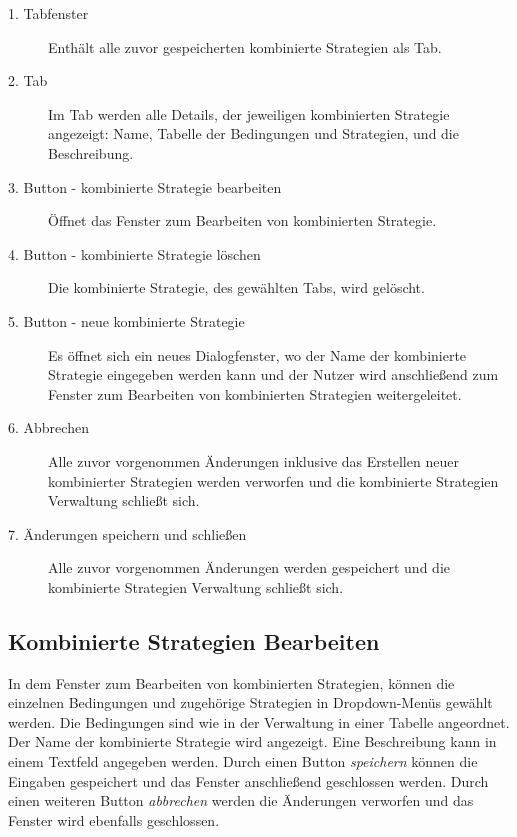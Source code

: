 \begin{description}

\item[1. Tabfenster] Enthält alle zuvor gespeicherten kombinierte Strategien als Tab.

\item[2. Tab] Im Tab werden alle Details, der jeweiligen kombinierten Strategie angezeigt: Name, Tabelle der Bedingungen und Strategien, und die Beschreibung.

\item[3. Button - kombinierte Strategie bearbeiten] Öffnet das Fenster zum Bearbeiten von kombinierten Strategie.

\item[4. Button - kombinierte Strategie löschen] Die kombinierte Strategie, des gewählten Tabs, wird gelöscht.

\item[5. Button - neue kombinierte Strategie] Es öffnet sich ein neues Dialogfenster, wo der Name der kombinierte Strategie eingegeben werden kann und der Nutzer wird anschließend zum Fenster zum Bearbeiten von kombinierten Strategien weitergeleitet.

\item[6. Abbrechen] Alle zuvor vorgenommen Änderungen inklusive das Erstellen neuer kombinierter Strategien werden verworfen und die kombinierte Strategien Verwaltung schließt sich.

\item[7. Änderungen speichern und schließen] Alle zuvor vorgenommen Änderungen werden gespeichert und die kombinierte Strategien Verwaltung schließt sich.

\end{description}


\subsection{Kombinierte Strategien Bearbeiten}

In dem Fenster zum Bearbeiten von kombinierten Strategien, können die einzelnen Bedingungen und zugehörige Strategien in Dropdown-Menüs gewählt werden. Die Bedingungen sind wie in der Verwaltung in einer Tabelle angeordnet. Der Name der kombinierte Strategie wird angezeigt. Eine Beschreibung kann in einem Textfeld angegeben werden.
Durch einen Button \textit{speichern} können die Eingaben gespeichert und das Fenster anschließend geschlossen werden. Durch einen weiteren Button \textit{abbrechen} werden die Änderungen verworfen und das Fenster wird ebenfalls  geschlossen.  

